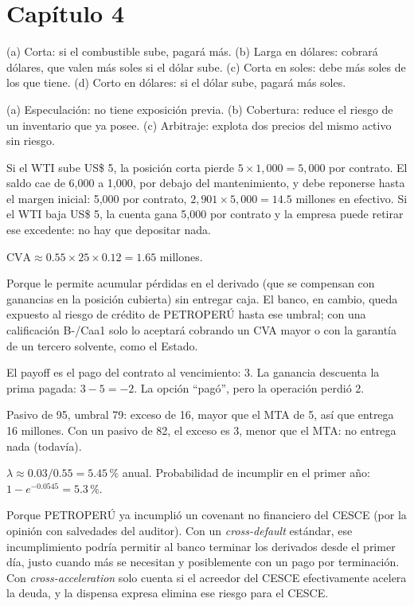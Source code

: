 \section*{Capítulo 4}

 (a) Corta: si el combustible sube, pagará más. (b) Larga en dólares: cobrará dólares, que valen más soles si el dólar sube. (c) Corta en soles: debe más soles de los que tiene. (d) Corto en dólares: si el dólar sube, pagará más soles.

 (a) Especulación: no tiene exposición previa. (b) Cobertura: reduce el riesgo de un inventario que ya posee. (c) Arbitraje: explota dos precios del mismo activo sin riesgo.

 Si el WTI sube US\$ 5, la posición corta pierde $5\times1{,}000=5{,}000$ por contrato. El saldo cae de 6,000 a 1,000, por debajo del mantenimiento, y debe reponerse hasta el margen inicial: 5,000 por contrato, $2{,}901\times5{,}000=14.5$ millones en efectivo. Si el WTI baja US\$ 5, la cuenta gana 5,000 por contrato y la empresa puede retirar ese excedente: no hay que depositar nada.

 $\text{CVA}\approx0.55\times25\times0.12=1.65$ millones.

 Porque le permite acumular pérdidas en el derivado (que se compensan con ganancias en la posición cubierta) sin entregar caja. El banco, en cambio, queda expuesto al riesgo de crédito de PETROPERÚ hasta ese umbral; con una calificación B-/Caa1 solo lo aceptará cobrando un CVA mayor o con la garantía de un tercero solvente, como el Estado.

 El payoff es el pago del contrato al vencimiento: 3. La ganancia descuenta la prima pagada: $3-5=-2$. La opción \enquote{pagó}, pero la operación perdió 2.

 Pasivo de 95, umbral 79: exceso de 16, mayor que el MTA de 5, así que entrega 16 millones. Con un pasivo de 82, el exceso es 3, menor que el MTA: no entrega nada (todavía).

 $\lambda\approx0.03/0.55=5.45\,\%$ anual. Probabilidad de incumplir en el primer año: $1-e^{-0.0545}=5.3\,\%$.

 Porque PETROPERÚ ya incumplió un covenant no financiero del CESCE (por la opinión con salvedades del auditor). Con un \emph{cross-default} estándar, ese incumplimiento podría permitir al banco terminar los derivados desde el primer día, justo cuando más se necesitan y posiblemente con un pago por terminación. Con \emph{cross-acceleration} solo cuenta si el acreedor del CESCE efectivamente acelera la deuda, y la dispensa expresa elimina ese riesgo para el CESCE.
